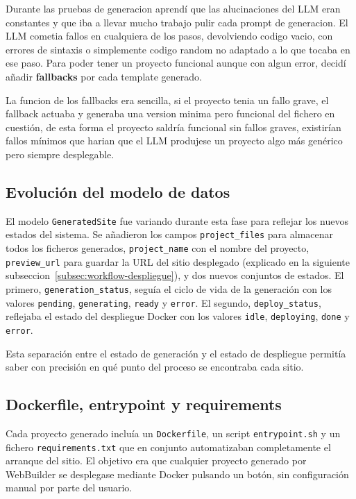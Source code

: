 Durante las pruebas de generacion aprendí que las alucinaciones del LLM eran constantes y que iba a llevar mucho trabajo pulir cada prompt de generacion. El LLM cometia fallos en 
cualquiera de los pasos, devolviendo codigo vacio, con errores de sintaxis o simplemente codigo random no adaptado a lo que tocaba en ese paso. Para poder tener un proyecto funcional aunque con algun error, decidí añadir \textbf{fallbacks} por cada template generado.

La funcion de los fallbacks era sencilla, si el proyecto tenia un fallo grave, el fallback actuaba y generaba una version minima pero funcional del fichero en cuestión, de esta forma el proyecto saldría funcional sin fallos graves, existirían fallos mínimos que harian que el LLM produjese un proyecto algo más genérico pero siempre desplegable.


\subsection{Evolución del modelo de datos}
\label{subsec:modelo-generatedsite}

El modelo \texttt{GeneratedSite} fue variando durante esta fase para reflejar los nuevos estados del sistema.
Se añadieron los campos \texttt{project\_files} para almacenar todos los ficheros generados, \texttt{project\_name} con el nombre del proyecto, \texttt{preview\_url} para guardar la URL del sitio desplegado (explicado en la siguiente subseccion~\ref{subsec:workflow-despliegue}), y dos nuevos conjuntos de estados. El primero, \texttt{generation\_status}, seguía el ciclo de vida de la generación con los valores \texttt{pending}, \texttt{generating}, \texttt{ready} y \texttt{error}. El segundo, \texttt{deploy\_status}, reflejaba el estado del despliegue Docker con los valores \texttt{idle}, \texttt{deploying}, \texttt{done} y \texttt{error}. 

Esta separación entre el estado de generación y el estado de despliegue permitía saber con precisión en qué punto del proceso se encontraba cada sitio.


\subsection*{Dockerfile, entrypoint y requirements}
\label{subsec:dockerfile}

Cada proyecto generado incluía un \texttt{Dockerfile}, un script \texttt{entrypoint.sh} y un fichero \texttt{requirements.txt} que en conjunto automatizaban completamente el arranque del sitio. El objetivo era que cualquier proyecto generado por WebBuilder se desplegase mediante Docker pulsando un botón, sin configuración manual por parte del usuario.


